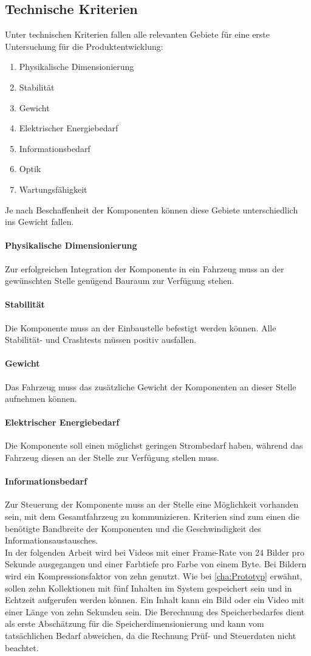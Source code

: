 \subsection{Technische Kriterien}
Unter technischen Kriterien fallen alle relevanten Gebiete für eine erste Untersuchung für die Produktentwicklung:
\begin{enumerate}
	\item Physikalische Dimensionierung
	\item Stabilität
	\item Gewicht
	\item Elektrischer Energiebedarf
	\item Informationsbedarf
	\item Optik
	\item Wartungsfähigkeit
\end{enumerate}
Je nach Beschaffenheit der Komponenten können diese Gebiete unterschiedlich ins Gewicht fallen.
\paragraph{Physikalische Dimensionierung}
Zur erfolgreichen Integration der Komponente in ein Fahrzeug muss an der gewünschten Stelle genügend Bauraum zur Verfügung stehen.
\paragraph{Stabilität}
Die Komponente muss an der Einbaustelle befestigt werden können. Alle Stabilität- und Crashtests müssen positiv ausfallen.
\paragraph{Gewicht}
Das Fahrzeug muss das zusätzliche Gewicht der Komponenten an dieser Stelle aufnehmen können.
\paragraph{Elektrischer Energiebedarf}
Die Komponente soll einen möglichst geringen Strombedarf haben, während das Fahrzeug diesen an der Stelle zur Verfügung stellen muss.
\paragraph{Informationsbedarf}
Zur Steuerung der Komponente muss an der Stelle eine Möglichkeit vorhanden sein, mit dem Gesamtfahrzeug zu kommunizieren. Kriterien sind zum einen die benötigte Bandbreite der Komponenten und die Geschwindigkeit des Informationsaustausches. \\
In der folgenden Arbeit wird bei Videos mit einer Frame-Rate von 24 Bilder pro Sekunde ausgegangen und einer Farbtiefe pro Farbe von einem Byte. Bei Bildern wird ein Kompressionsfaktor von zehn genutzt. Wie bei \ref{cha:Prototyp} erwähnt, sollen zehn Kollektionen mit fünf Inhalten im System gespeichert sein und in Echtzeit aufgerufen werden können. Ein Inhalt kann ein Bild oder ein Video mit einer Länge von zehn Sekunden sein.
Die Berechnung des Speicherbedarfes dient als erste Abschätzung für die Speicherdimensionierung und kann vom tatsächlichen Bedarf abweichen, da die Rechnung Prüf- und Steuerdaten nicht beachtet.
